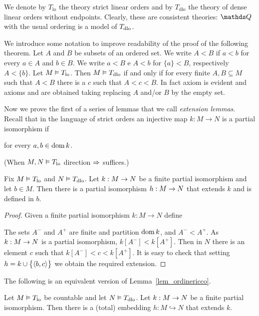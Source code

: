 \documentclass[creche.tex]{subfiles}
\begin{document}
We denote by \emph{$T_{\textrm{lo}}$} the theory strict linear orders and by \emph{$T_{\textrm{dlo}}$} the theory of dense linear orders without endpoints. Clearly, these are consistent theories: $\QQ$ with the usual ordering is a model of $T_{\rm dlo}$.

We introduce some notation to improve readability of the proof of the following theorem. Let $A$ and $B$ be subsets of an ordered set. We write $A<B$ if $a<b$ for every $a\in A$ and $b\in B$. We write $a<B$ e $A<b$ for $\{a\}<B$, respectively $A<\{b\}$. Let $M\models T_{\rm lo}$. Then $M\models T_{\rm dlo}$ if and only if for every finite $A, B\subseteq M$ such that $A<B$ there is a $c$ such that  $A<c<B$.  In fact axiom  is evident and axioms  and  are obtained taking replacing $A$ and/or $B$ by the empty set.

Now we prove the first of a series of lemmas that we call \emph{extension lemmas}. Recall that in the language of strict orders an injective map $k:M\to N$ is a partial isomorphism if 

\hfill for every $a,b\in\dom k$.

(When $M,N\models T_{\rm lo}$ direction $\IMP$ suffices.)

\begin{lemma}\label{lem_ordinericco}
Fix $M\models T_{\rm lo}$ and $N\models T_{\rm dlo}$. Let $k:M\imp N$ be a finite partial isomorphism and let $b\in M$. Then there is a partial isomorphism $h:M\imp N$ that extends $k$ and is defined in $b$.
\end{lemma}

\begin{proof}
Given a finite partial isomorphism $k:M\to N$ define



The sets $A^-$ and $A^+$ are finite and partition $\dom k$, and  $A^-<A^+$. As $k:M\imp N$ is a partial isomorphism, $k[A^-]<k[A^+]$. Then in $N$ there is an element $c$ such that $k[A^-]<c<k[A^+]$. It is easy to check that setting $h=k\cup\big\{\<b,c\>\big\}$ we obtain the required extension.
\end{proof}

The following is an equivalent version of Lemma~\ref{lem_ordinericco}.

\begin{corollary}\label{coroll_ordinericco}
Let $M\models T_{\rm lo}$ be countable and let $N\models T_{\rm dlo}$. Let $k:M\imp N$ be a finite partial isomorphism. Then there is a (total) embedding $h:M\hookrightarrow N$ that extends $k$.
\end{corollary}
\end{document}
